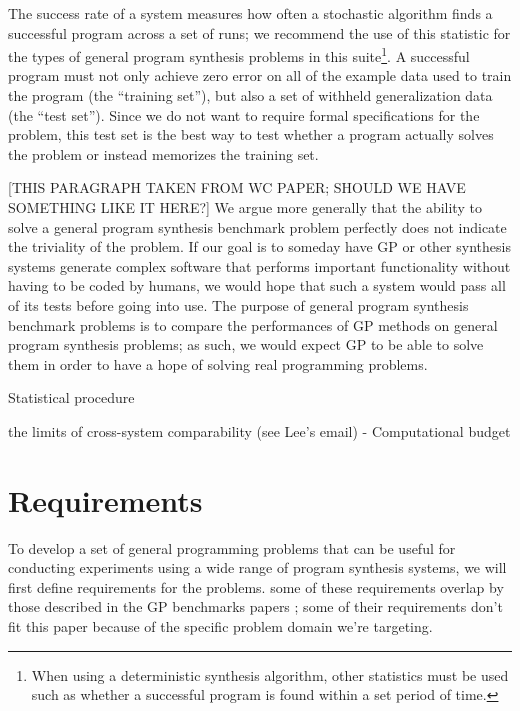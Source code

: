 \documentclass{sig-alternate}
\begin{document}
The success rate of a system measures how often a stochastic algorithm finds a successful program across a set of runs; we recommend the use of this statistic for the types of general program synthesis problems in this suite\footnote{When using a deterministic synthesis algorithm, other statistics must be used such as whether a successful program is found within a set period of time.}.
A successful program must not only achieve zero error on all of the example data used to train the program (the ``training set''), but also a set of withheld generalization data (the ``test set''). Since we do not want to require formal specifications for the problem, this test set is the best way to test whether a program actually solves the problem or instead memorizes the training set.


[THIS PARAGRAPH TAKEN FROM WC PAPER; SHOULD WE HAVE SOMETHING LIKE IT HERE?] We argue more generally that the ability to solve a general program synthesis benchmark problem perfectly does not indicate the triviality of the problem. If our goal is to someday have GP or other synthesis systems generate complex software that performs important functionality without having to be coded by humans, we would hope that such a system would pass all of its tests before going into use. The purpose of general program synthesis benchmark problems is to compare the performances of GP methods on general program synthesis problems; as such, we would expect GP to be able to solve them in order to have a hope of solving real programming problems.



Statistical procedure

the limits of cross-system comparability (see Lee's email)
- Computational budget


\section{Requirements} \label{requirements}

To develop a set of general programming problems that can be useful for conducting experiments using a wide range of program synthesis systems, we will first define requirements for the problems. some of these requirements overlap by those described in the GP benchmarks papers \cite{McDermott:2012:GECCO, White:2013:BGB:2441218.2441242}; some of their requirements don't fit this paper because of the specific problem domain we're targeting.
\end{document}
